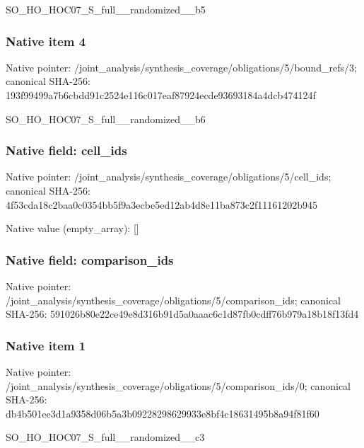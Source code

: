 \documentclass[10pt,a4paper]{article}
\begin{document}
\begingroup\raggedright\sloppy SO\_\allowbreak{}HO\_\allowbreak{}HOC07\_\allowbreak{}S\_\allowbreak{}full\_\allowbreak{}\_\allowbreak{}randomized\_\allowbreak{}\_\allowbreak{}b5\par\endgroup

\subsubsection{Native item 4}
Native pointer: /joint\_\allowbreak{}analysis/synthesis\_\allowbreak{}coverage/obligations/5/bound\_\allowbreak{}refs/3; canonical SHA-256: 193f99499a7b6cbdd91c2524e116c017eaf87924ecde93693184a4dcb474124f

\begingroup\raggedright\sloppy SO\_\allowbreak{}HO\_\allowbreak{}HOC07\_\allowbreak{}S\_\allowbreak{}full\_\allowbreak{}\_\allowbreak{}randomized\_\allowbreak{}\_\allowbreak{}b6\par\endgroup

\subsubsection{Native field: cell\_\allowbreak{}ids}
Native pointer: /joint\_\allowbreak{}analysis/synthesis\_\allowbreak{}coverage/obligations/5/cell\_\allowbreak{}ids; canonical SHA-256: 4f53cda18c2baa0c0354bb5f9a3ecbe5ed12ab4d8e11ba873c2f11161202b945

Native value (empty\_\allowbreak{}array): []

\subsubsection{Native field: comparison\_\allowbreak{}ids}
Native pointer: /joint\_\allowbreak{}analysis/synthesis\_\allowbreak{}coverage/obligations/5/comparison\_\allowbreak{}ids; canonical SHA-256: 591026b80e22ce49e8d316b91d5a0aaac6c1d87fb0cdff76b979a18b18f13fd4

\subsubsection{Native item 1}
Native pointer: /joint\_\allowbreak{}analysis/synthesis\_\allowbreak{}coverage/obligations/5/comparison\_\allowbreak{}ids/0; canonical SHA-256: db4b501ee3d1a9358d06b5a3b09228298629933e8bf4c18631495b8a94f81f60

\begingroup\raggedright\sloppy SO\_\allowbreak{}HO\_\allowbreak{}HOC07\_\allowbreak{}S\_\allowbreak{}full\_\allowbreak{}\_\allowbreak{}randomized\_\allowbreak{}\_\allowbreak{}c3\par\endgroup
\end{document}

